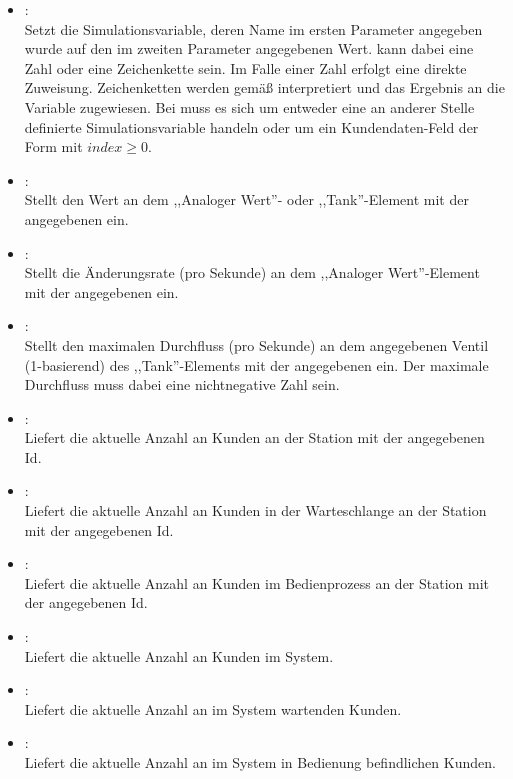 \begin{itemize}

\item
{}:\\
Setzt die Simulationsvariable, deren Name im ersten Parameter angegeben wurde auf den im zweiten Parameter angegebenen Wert.
 kann dabei eine Zahl oder eine Zeichenkette sein. Im Falle einer Zahl erfolgt eine direkte Zuweisung.
Zeichenketten werden gemäß  interpretiert und das Ergebnis an die Variable zugewiesen. Bei 
muss es sich um entweder eine an anderer Stelle definierte Simulationsvariable handeln oder um ein Kundendaten-Feld der Form
 mit $index\ge0$.

\item
{}:\\
Stellt den Wert an dem ,,Analoger Wert''- oder ,,Tank''-Element mit der angegebenen  ein.
  
\item
{}:\\
Stellt die Änderungsrate (pro Sekunde) an dem ,,Analoger Wert''-Element mit der angegebenen  ein.
  
\item
{}:\\
Stellt den maximalen Durchfluss (pro Sekunde) an dem angegebenen Ventil (1-basierend) des ,,Tank''-Elements mit der angegebenen  ein.
Der maximale Durchfluss muss dabei eine nichtnegative Zahl sein. 

\item
{}:\\
Liefert die aktuelle Anzahl an Kunden an der Station mit der angegebenen Id.
  
\item
{}:\\
Liefert die aktuelle Anzahl an Kunden in der Warteschlange an der Station mit der angegebenen Id.

\item
{}:\\
Liefert die aktuelle Anzahl an Kunden im Bedienprozess an der Station mit der angegebenen Id.

\item
{}:\\
Liefert die aktuelle Anzahl an Kunden im System.
  
\item
{}:\\
Liefert die aktuelle Anzahl an im System wartenden Kunden.

\item
{}:\\
Liefert die aktuelle Anzahl an im System in Bedienung befindlichen Kunden.

\end{itemize}

